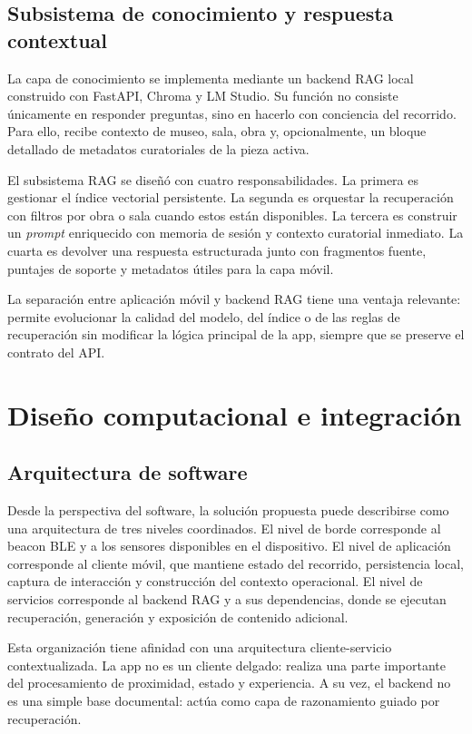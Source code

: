 \subsection{Subsistema de conocimiento y respuesta contextual}

La capa de conocimiento se implementa mediante un backend RAG local construido con FastAPI, Chroma y LM Studio. Su función no consiste únicamente en responder preguntas, sino en hacerlo con conciencia del recorrido. Para ello, recibe contexto de museo, sala, obra y, opcionalmente, un bloque detallado de metadatos curatoriales de la pieza activa.

El subsistema RAG se diseñó con cuatro responsabilidades. La primera es gestionar el índice vectorial persistente. La segunda es orquestar la recuperación con filtros por obra o sala cuando estos están disponibles. La tercera es construir un \textit{prompt} enriquecido con memoria de sesión y contexto curatorial inmediato. La cuarta es devolver una respuesta estructurada junto con fragmentos fuente, puntajes de soporte y metadatos útiles para la capa móvil.

La separación entre aplicación móvil y backend RAG tiene una ventaja relevante: permite evolucionar la calidad del modelo, del índice o de las reglas de recuperación sin modificar la lógica principal de la app, siempre que se preserve el contrato del API.

\section{Diseño computacional e integración}

\subsection{Arquitectura de software}

Desde la perspectiva del software, la solución propuesta puede describirse como una arquitectura de tres niveles coordinados. El nivel de borde corresponde al beacon BLE y a los sensores disponibles en el dispositivo. El nivel de aplicación corresponde al cliente móvil, que mantiene estado del recorrido, persistencia local, captura de interacción y construcción del contexto operacional. El nivel de servicios corresponde al backend RAG y a sus dependencias, donde se ejecutan recuperación, generación y exposición de contenido adicional.

Esta organización tiene afinidad con una arquitectura cliente-servicio contextualizada. La app no es un cliente delgado: realiza una parte importante del procesamiento de proximidad, estado y experiencia. A su vez, el backend no es una simple base documental: actúa como capa de razonamiento guiado por recuperación.

